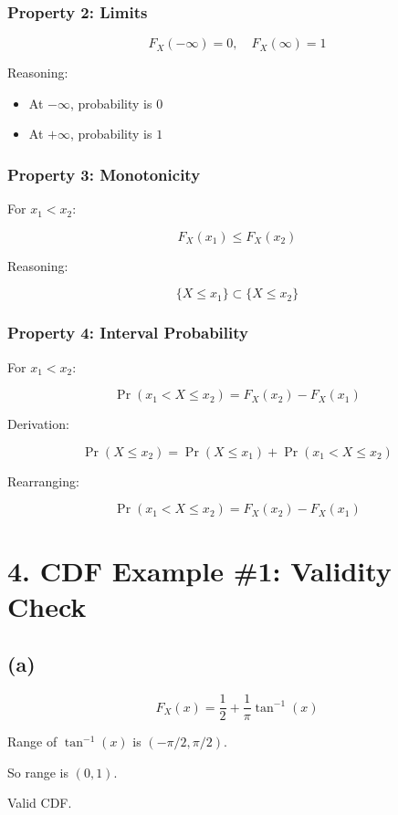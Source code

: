 \documentclass[12pt]{article}
\begin{document}
\subsubsection*{Property 2: Limits}

\[
F_X(-\infty)=0, \quad F_X(\infty)=1
\]

Reasoning:

\begin{itemize}
\item At $-\infty$, probability is $0$
\item At $+\infty$, probability is $1$
\end{itemize}

\subsubsection*{Property 3: Monotonicity}

For $x_1 < x_2$:

\[
F_X(x_1) \le F_X(x_2)
\]

Reasoning:

\[
\{X \le x_1\} \subset \{X \le x_2\}
\]

\subsubsection*{Property 4: Interval Probability}

For $x_1 < x_2$:

\[
\Pr(x_1 < X \le x_2)=F_X(x_2)-F_X(x_1)
\]

Derivation:

\[
\Pr(X \le x_2)=\Pr(X \le x_1)+\Pr(x_1<X\le x_2)
\]

Rearranging:

\[
\Pr(x_1<X\le x_2)=F_X(x_2)-F_X(x_1)
\]

\section*{4. CDF Example \#1: Validity Check}

\subsection*{(a)}

\[
F_X(x)=\frac{1}{2}+\frac{1}{\pi}\tan^{-1}(x)
\]

Range of $\tan^{-1}(x)$ is $(-\pi/2,\pi/2)$.

So range is $(0,1)$.

Valid CDF.
\end{document}

